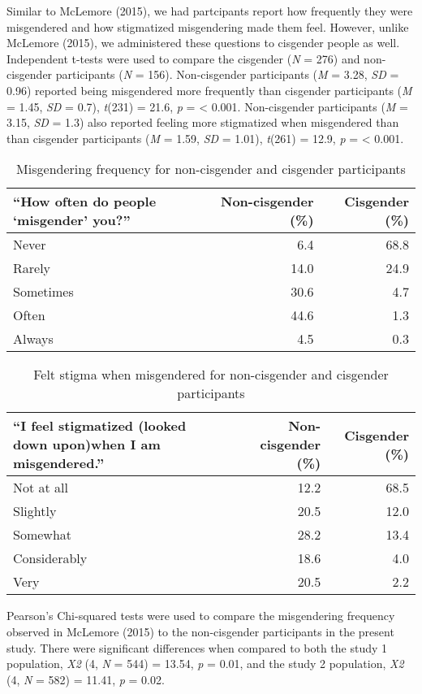 \documentclass[12pt,twoside]{reedthesis}
\begin{document}
Similar to McLemore (2015), we had partcipants report how frequently
they were misgendered and how stigmatized misgendering made them feel.
However, unlike McLemore (2015), we administered these questions to
cisgender people as well. Independent t-tests were used to compare the
cisgender (\emph{N} = 276) and non-cisgender participants (\emph{N} =
156). Non-cisgender participants (\emph{M} = 3.28, \emph{SD} = 0.96)
reported being misgendered more frequently than cisgender participants
(\emph{M} = 1.45, \emph{SD} = 0.7), \emph{t}(231) = 21.6, \emph{p} =
\textless{} 0.001. Non-cisgender participants (\emph{M} = 3.15,
\emph{SD} = 1.3) also reported feeling more stigmatized when misgendered
than than cisgender participants (\emph{M} = 1.59, \emph{SD} = 1.01),
\emph{t}(261) = 12.9, \emph{p} = \textless{} 0.001.
\begin{table}

\caption{\label{tab:unnamed-chunk-1}Misgendering frequency for non-cisgender and cisgender participants}
\centering
\begin{tabular}[t]{l|r|r}
\hline
“How often do people ‘misgender’ you?” & Non-cisgender (\%) & Cisgender (\%)\\
\hline
Never & 6.4 & 68.8\\
\hline
Rarely & 14.0 & 24.9\\
\hline
Sometimes & 30.6 & 4.7\\
\hline
Often & 44.6 & 1.3\\
\hline
Always & 4.5 & 0.3\\
\hline
\end{tabular}
\end{table}
\begin{table}

\caption{\label{tab:unnamed-chunk-2}Felt stigma when misgendered for non-cisgender and cisgender participants}
\centering
\begin{tabular}[t]{l|r|r}
\hline
“I feel stigmatized (looked down upon)when I am misgendered.” & Non-cisgender (\%) & Cisgender (\%)\\
\hline
Not at all & 12.2 & 68.5\\
\hline
Slightly & 20.5 & 12.0\\
\hline
Somewhat & 28.2 & 13.4\\
\hline
Considerably & 18.6 & 4.0\\
\hline
Very & 20.5 & 2.2\\
\hline
\end{tabular}
\end{table}
Pearson's Chi-squared tests were used to compare the misgendering
frequency observed in McLemore (2015) to the non-cisgender participants
in the present study. There were significant differences when compared
to both the study 1 population, \emph{X2} (4, \emph{N} = 544) = 13.54,
\emph{p} = 0.01, and the study 2 population, \emph{X2} (4, \emph{N} =
582) = 11.41, \emph{p} = 0.02.
\end{document}
